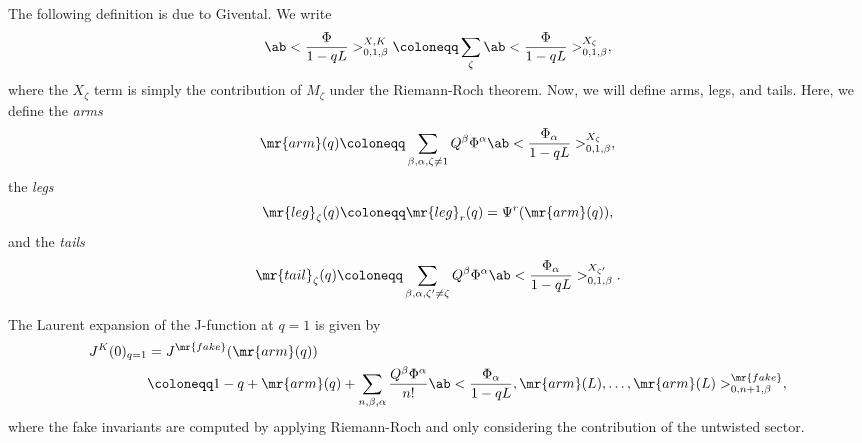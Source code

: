 %
%

The following definition is due to Givental. We write
\[ \ab<\frac{\Phi}{1-qL}>_{0,1,\beta}^{X,K} \coloneqq \sum_{\zeta} \ab<\frac{\Phi}{1-qL}>_{0,1,\beta}^{X_{\zeta}}, \]
where the \(X_{\zeta}\) term is simply the contribution of \(M_{\zeta}\) under the Riemann-Roch theorem. Now, we will define arms, legs, and tails. Here, we define the \textit{arms}
\[ \mr{arm}(q) \coloneqq \sum_{\beta, \alpha, \zeta \neq 1} Q^{\beta} \Phi^{\alpha}\ab<\frac{\Phi_{\alpha}}{1-qL}>_{0,1,\beta}^{X_{\zeta}}, \]
the \textit{legs}
\[ \mr{leg}_{\zeta}(q) \coloneqq \mr{leg}_r(q) = \Psi^r (\mr{arm}(q)), \]
and the \textit{tails}
\[ \mr{tail}_{\zeta}(q) \coloneqq \sum_{\beta, \alpha, \zeta' \neq \zeta} Q^{\beta} \Phi^{\alpha} \ab<\frac{\Phi_{\alpha}}{1-qL}>_{0,1,\beta}^{X_{\zeta'}}. \]

\begin{prop}
    The Laurent expansion of the J-function at \(q = 1\) is given by
    \begin{align*}
        J^K(0)_{q=1} &= J^{\mr{fake}}(\mr{arm}(q)) \\
        &\coloneqq 1-q + \mr{arm}(q) + \sum_{n,\beta,\alpha} \frac{Q^{\beta}\Phi^{\alpha}}{n!} \ab<\frac{\Phi_{\alpha}}{1-qL}, \mr{arm}(L), \ldots, \mr{arm}(L)>_{0,n+1,\beta}^{\mr{fake}},
    \end{align*}
    where the fake invariants are computed by applying Riemann-Roch and only considering the contribution of the untwisted sector.
\end{prop}


